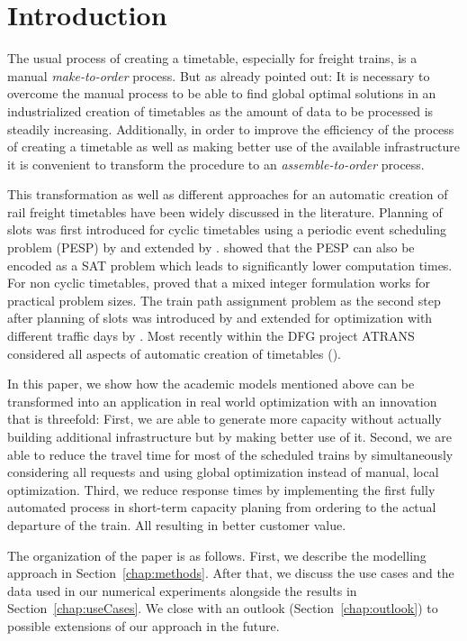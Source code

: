 \section{Introduction}
\label{chap:intro}
%
The usual process of creating a timetable, especially for freight trains, is a manual \emph{make-to-order} process. But as \cite{FP:2014} already pointed out: It is necessary to overcome the manual process to be able to find global optimal solutions in an industrialized creation of timetables as the amount of data to be processed is steadily increasing. Additionally, in order to improve the efficiency of the process of creating a timetable as well as making better use of the available infrastructure it is convenient to transform the procedure to an \emph{assemble-to-order} process.

This transformation as well as different approaches for an automatic creation of rail freight timetables have been widely discussed in the literature. Planning of slots was first introduced for cyclic timetables using a periodic event scheduling problem (PESP) by \cite{N:1998} and extended by \cite{O:2009}. \cite{G:2012} showed that the PESP can also be encoded as a SAT problem which leads to significantly lower computation times. For non cyclic timetables, \cite{G:2013} proved that a mixed integer formulation works for practical problem sizes. The train path assignment problem as the second step after planning of slots was introduced by \cite{NO:2014} and extended for optimization with different traffic days by \cite{N:2015}. Most recently within the DFG project ATRANS considered all aspects of automatic creation of timetables (\cite{CS, XL}).

In this paper, we show how the academic models mentioned above can be transformed into an application in real world optimization with an innovation that is threefold: First, we are able to generate more capacity without actually building additional infrastructure but by making better use of it. Second, we are able to reduce the travel time for most of the scheduled trains by simultaneously considering all requests and using global optimization instead of manual, local optimization. Third, we reduce response times by implementing the first fully automated process in short-term capacity planing from ordering to the actual departure of the train. All resulting in better customer value.

The organization of the paper is as follows. First, we describe the modelling approach in Section~\ref{chap:methods}. After that, we discuss the use cases and the data used in our numerical experiments alongside the results in Section~\ref{chap:useCases}. We close with an outlook (Section~\ref{chap:outlook}) to possible extensions of our approach in the future.